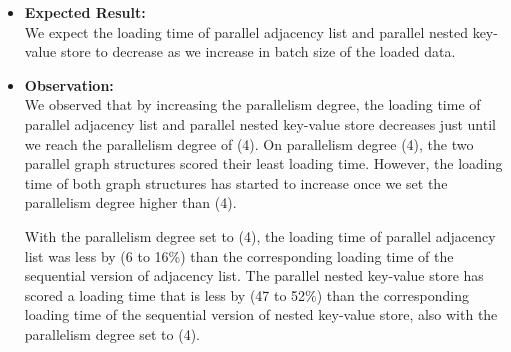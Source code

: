 {\begin{itemize}



\item \textbf{Expected Result:}\\
We expect the loading time of parallel adjacency list and parallel nested key-value store to decrease as we increase in batch size of the loaded data.


\item \textbf{Observation:}\\
We observed that by increasing the parallelism degree, the loading time of parallel adjacency list and parallel nested key-value store decreases just until we reach the parallelism degree of (4). On parallelism degree (4), the two parallel graph structures scored their least loading time. However, the loading time of both graph structures has started to increase once we set the parallelism degree higher than (4).

With the parallelism degree set to (4), the loading time of parallel adjacency list was less by (6 to 16\%) than the corresponding loading time of the sequential version of adjacency list. The parallel nested key-value store has scored a loading time that is less by (47 to 52\%) than the corresponding loading time of the sequential version of nested key-value store, also with the parallelism degree set to (4).


\end{itemize}}

